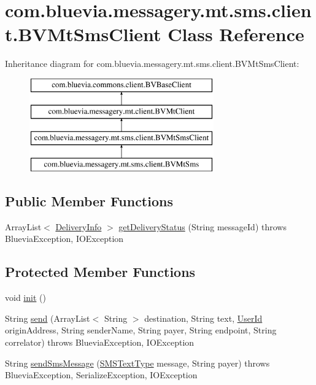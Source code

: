 \hypertarget{classcom_1_1bluevia_1_1messagery_1_1mt_1_1sms_1_1client_1_1BVMtSmsClient}{
\section{com.bluevia.messagery.mt.sms.client.BVMtSmsClient Class Reference}
\label{classcom_1_1bluevia_1_1messagery_1_1mt_1_1sms_1_1client_1_1BVMtSmsClient}
}
Inheritance diagram for com.bluevia.messagery.mt.sms.client.BVMtSmsClient:\begin{figure}[H]
\begin{center}
\leavevmode
\includegraphics[height=4.000000cm]{classcom_1_1bluevia_1_1messagery_1_1mt_1_1sms_1_1client_1_1BVMtSmsClient}
\end{center}
\end{figure}
\subsection*{Public Member Functions}
\begin{DoxyCompactItemize}
\item 
ArrayList$<$ \hyperlink{classcom_1_1bluevia_1_1messagery_1_1mt_1_1data_1_1DeliveryInfo}{DeliveryInfo} $>$ \hyperlink{classcom_1_1bluevia_1_1messagery_1_1mt_1_1sms_1_1client_1_1BVMtSmsClient_a2854d84100f987e9c69a0425badbc058}{getDeliveryStatus} (String messageId)  throws BlueviaException, IOException 
\end{DoxyCompactItemize}
\subsection*{Protected Member Functions}
\begin{DoxyCompactItemize}
\item 
void \hyperlink{classcom_1_1bluevia_1_1messagery_1_1mt_1_1sms_1_1client_1_1BVMtSmsClient_a85ce02bba1fe9a34cc840e857101c2d3}{init} ()
\item 
String \hyperlink{classcom_1_1bluevia_1_1messagery_1_1mt_1_1sms_1_1client_1_1BVMtSmsClient_aee3aacc374f3af3fe918552161193ae0}{send} (ArrayList$<$ String $>$ destination, String text, \hyperlink{classcom_1_1bluevia_1_1commons_1_1data_1_1UserId}{UserId} originAddress, String senderName, String payer, String endpoint, String correlator)  throws BlueviaException, IOException 
\item 
String \hyperlink{classcom_1_1bluevia_1_1messagery_1_1mt_1_1sms_1_1client_1_1BVMtSmsClient_ae3b2784988814f2344dce2f657943728}{sendSmsMessage} (\hyperlink{classcom_1_1telefonica_1_1schemas_1_1unica_1_1rest_1_1sms_1_1v1_1_1SMSTextType}{SMSTextType} message, String payer)  throws BlueviaException, SerializeException, IOException 
\end{DoxyCompactItemize}



